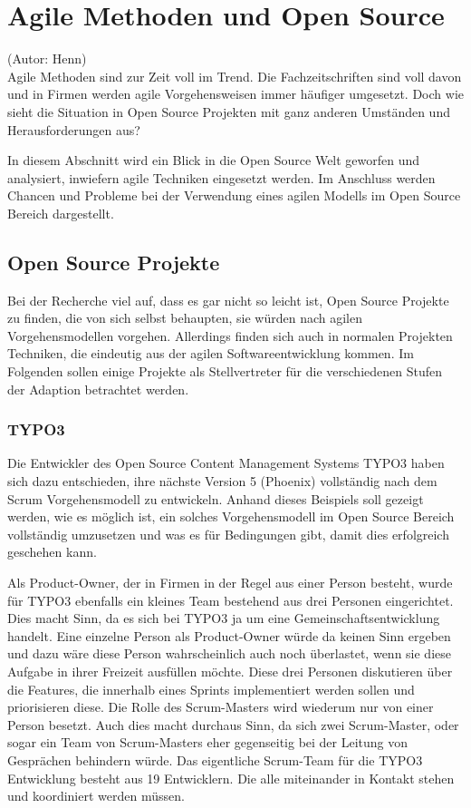\section{Agile Methoden und Open Source}
(Autor: Henn)\\

Agile Methoden sind zur Zeit voll im Trend. Die Fachzeitschriften sind voll davon und in Firmen
werden agile Vorgehensweisen immer häufiger umgesetzt. Doch wie sieht die Situation in Open Source
Projekten mit ganz anderen Umständen und Herausforderungen aus?

In diesem Abschnitt wird ein Blick in die Open Source Welt geworfen und
analysiert, inwiefern agile Techniken eingesetzt werden. Im Anschluss werden
Chancen und Probleme bei der Verwendung eines agilen Modells im Open Source
Bereich dargestellt.


\subsection{Open Source Projekte}
Bei der Recherche viel auf, dass es gar nicht so leicht ist, Open Source
Projekte zu finden, die von sich selbst behaupten, sie würden nach agilen
Vorgehensmodellen vorgehen. Allerdings finden sich auch in normalen Projekten
Techniken, die eindeutig aus der agilen Softwareentwicklung kommen. Im Folgenden
sollen einige Projekte als Stellvertreter für die verschiedenen Stufen der
Adaption betrachtet werden.

\subsubsection{TYPO3}
Die Entwickler des Open Source Content Management Systems TYPO3 haben sich dazu
entschieden, ihre nächste Version 5 (Phoenix) vollständig nach dem Scrum Vorgehensmodell zu
entwickeln. Anhand dieses Beispiels soll gezeigt werden, wie es möglich ist,
ein solches Vorgehensmodell im Open Source Bereich vollständig umzusetzen und
was es für Bedingungen gibt, damit dies erfolgreich geschehen kann.

Als Product-Owner, der in Firmen in der Regel aus einer Person besteht, wurde für TYPO3
ebenfalls ein kleines Team bestehend aus drei Personen eingerichtet. Dies macht Sinn, da es sich bei
TYPO3 ja um eine Gemeinschaftsentwicklung handelt. Eine einzelne Person als Product-Owner würde da
keinen Sinn ergeben und dazu wäre diese Person wahrscheinlich auch noch überlastet, wenn sie diese
Aufgabe in ihrer Freizeit ausfüllen möchte. Diese drei Personen diskutieren über die Features, die
innerhalb eines Sprints implementiert werden sollen und priorisieren diese.
\newline Die Rolle des Scrum-Masters wird wiederum nur von einer Person besetzt. Auch dies macht
durchaus Sinn, da sich zwei Scrum-Master, oder sogar ein Team von Scrum-Masters eher gegenseitig bei
der Leitung von Gesprächen behindern würde.
\newline Das eigentliche Scrum-Team für die TYPO3 Entwicklung besteht aus 19 Entwicklern. Die alle
miteinander in Kontakt stehen und koordiniert werden müssen.

